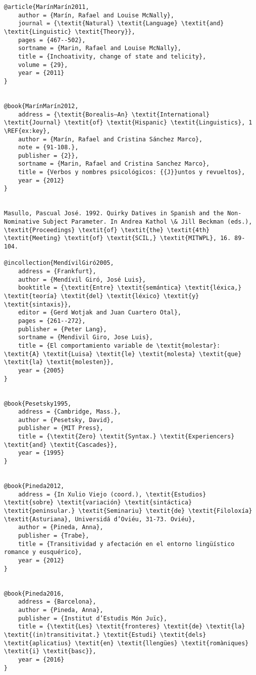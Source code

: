 \documentclass[output=paper,modfonts,nonflat]{langsci/langscibook}
\begin{document}
\begin{verbatim}
@article{MarínMarín2011,
	author = {Marín, Rafael and Louise McNally},
	journal = {\textit{Natural} \textit{Language} \textit{and} \textit{Linguistic} \textit{Theory}},
	pages = {467--502},
	sortname = {Marin, Rafael and Louise McNally},
	title = {Inchoativity, change of state and telicity},
	volume = {29},
	year = {2011}
}


@book{MarínMarín2012,
	address = {\textit{Borealis–An} \textit{International} \textit{Journal} \textit{of} \textit{Hispanic} \textit{Linguistics}, 1 \REF{ex:key},
	author = {Marín, Rafael and Cristina Sánchez Marco},
	note = {91-108.},
	publisher = {2}},
	sortname = {Marin, Rafael and Cristina Sanchez Marco},
	title = {Verbos y nombres psicológicos: {{J}}untos y revueltos},
	year = {2012}
}


Masullo, Pascual José. 1992. Quirky Datives in Spanish and the Non-Nominative Subject Parameter. In Andrea Kathol \& Jill Beckman (eds.), \textit{Proceedings} \textit{of} \textit{the} \textit{4th} \textit{Meeting} \textit{of} \textit{SCIL,} \textit{MITWPL}, 16. 89-104.

@incollection{MendívilGiró2005,
	address = {Frankfurt},
	author = {Mendívil Giró, José Luis},
	booktitle = {\textit{Entre} \textit{semántica} \textit{léxica,} \textit{teoría} \textit{del} \textit{léxico} \textit{y} \textit{sintaxis}},
	editor = {Gerd Wotjak and Juan Cuartero Otal},
	pages = {261--272},
	publisher = {Peter Lang},
	sortname = {Mendivil Giro, Jose Luis},
	title = {El comportamiento variable de \textit{molestar}: \textit{A} \textit{Luisa} \textit{le} \textit{molesta} \textit{que} \textit{la} \textit{molesten}},
	year = {2005}
}


@book{Pesetsky1995,
	address = {Cambridge, Mass.},
	author = {Pesetsky, David},
	publisher = {MIT Press},
	title = {\textit{Zero} \textit{Syntax.} \textit{Experiencers} \textit{and} \textit{Cascades}},
	year = {1995}
}


@book{Pineda2012,
	address = {In Xulio Viejo (coord.), \textit{Estudios} \textit{sobre} \textit{variación} \textit{sintáctica} \textit{peninsular.} \textit{Seminariu} \textit{de} \textit{Filoloxía} \textit{Asturiana}, Universidá d’Oviéu, 31-73. Oviéu},
	author = {Pineda, Anna},
	publisher = {Trabe},
	title = {Transitividad y afectación en el entorno lingüístico romance y eusquérico},
	year = {2012}
}


@book{Pineda2016,
	address = {Barcelona},
	author = {Pineda, Anna},
	publisher = {Institut d’Estudis Món Juïc},
	title = {\textit{Les} \textit{fronteres} \textit{de} \textit{la} \textit{(in)transitivitat.} \textit{Estudi} \textit{dels} \textit{aplicatius} \textit{en} \textit{llengües} \textit{romàniques} \textit{i} \textit{basc}},
	year = {2016}
}



\end{verbatim}
\end{document}
